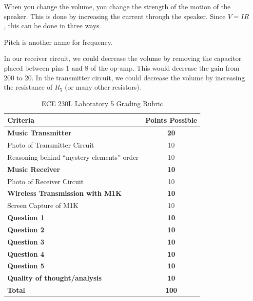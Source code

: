 \documentclass[12pt]{../manual}
\begin{document}
When you change the volume, you change the strength of the motion of the speaker. This is done by increasing the current through the speaker. Since $V=IR$, this can be done in three ways. 

Pitch is another name for frequency.

In our receiver circuit, we could decrease the volume by removing the capacitor placed between pins 1 and 8 of the op-amp. This would decrease the gain from 200 to 20. In the transmitter circuit, we could decrease the volume by increasing the resistance of $R_5$ (or many other resistors).

%
\newpage
{}
{}
\hspace{0pt}
\vfill %
\begin{table}[ht!]
\caption{ECE 230L Laboratory 5 Grading Rubric}
\centering
\begin{tabular}{l|c} \hline
Criteria & Points Possible \\ \hline \hline
\textbf{Music Transmitter} 						& \textbf{20} \\
Photo of Transmitter Circuit					& 10 \\
Reasoning behind ``mystery elements'' order		& 10 \\ \hline
\textbf{Music Receiver} 						& \textbf{10} \\
Photo of Receiver Circuit						& 10 \\ \hline
\textbf{Wireless Transmission with M1K} 		& \textbf{10} \\
Screen Capture of M1K							& 10 \\ \hline
\textbf{Question 1} 							& \textbf{10} \\ \hline
\textbf{Question 2} 							& \textbf{10} \\ \hline
\textbf{Question 3} 							& \textbf{10} \\ \hline
\textbf{Question 4} 							& \textbf{10} \\ \hline
\textbf{Question 5} 							& \textbf{10} \\ \hline
\textbf{Quality of thought/analysis} 			& \textbf{10} \\ \hline \hline
\textbf{Total} 									& \textbf{100} \\ \hline
\end{tabular}
\end{table}
\vfill %
\end{document}
